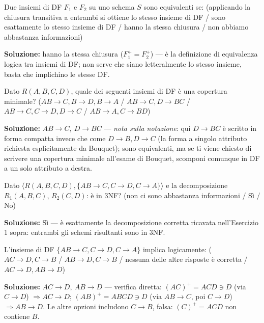 \documentclass[12pt, a4paper]{article}
\begin{document}
\begin{tcolorbox}[colback=lightergray!10, colframe=tocsec, title=\textbf{Esercizio 2}]
Due insiemi di DF $F_1$ e $F_2$ su uno schema $S$ sono equivalenti se: (applicando la chiusura transitiva a entrambi si ottiene lo stesso insieme di DF / sono esattamente lo stesso insieme di DF / hanno la stessa chiusura / non abbiamo abbastanza informazioni)
\end{tcolorbox}
\textbf{Soluzione:} hanno la stessa chiusura ($F_1^+ = F_2^+$) — è la definizione di equivalenza logica tra insiemi di DF; non serve che siano letteralmente lo stesso insieme, basta che implichino le stesse DF.

\begin{tcolorbox}[colback=lightergray!10, colframe=tocsec, title=\textbf{Esercizio 3}]
Dato $R(A,B,C,D)$, quale dei seguenti insiemi di DF è una copertura minimale? ($AB\to C, B\to D, B\to A$ / $AB\to C, D\to BC$ / $AB\to C, C\to D, D\to C$ / $AB\to A, C\to BD$)
\end{tcolorbox}
\textbf{Soluzione:} $AB\to C,\ D\to BC$ — \textit{nota sulla notazione}: qui $D\to BC$ è scritto in forma compatta invece che come $D\to B, D\to C$ (la forma a singolo attributo richiesta esplicitamente da Bouquet); sono equivalenti, ma se ti viene chiesto di scrivere una copertura minimale all'esame di Bouquet, scomponi comunque in DF a un solo attributo a destra.

\begin{tcolorbox}[colback=lightergray!10, colframe=tocsec, title=\textbf{Esercizio 4}]
Dato $\langle R(A,B,C,D), \{AB\to C, C\to D, C\to A\}\rangle$ e la decomposizione $R_1(A,B,C)$, $R_2(C,D)$: è in 3NF? (non ci sono abbastanza informazioni / Sì / No)
\end{tcolorbox}
\textbf{Soluzione:} Sì — è esattamente la decomposizione corretta ricavata nell'Esercizio 1 sopra: entrambi gli schemi risultanti sono in 3NF.

\begin{tcolorbox}[colback=lightergray!10, colframe=tocsec, title=\textbf{Esercizio 5}]
L'insieme di DF $\{AB\to C, C\to D, C\to A\}$ implica logicamente: ($AC\to D, C\to B$ / $AB\to D, C\to B$ / nessuna delle altre risposte è corretta / $AC\to D, AB\to D$)
\end{tcolorbox}
\textbf{Soluzione:} $AC\to D,\ AB\to D$ — verifica diretta: $(AC)^+=ACD \ni D$ (via $C\to D$) $\Rightarrow AC\to D$; $(AB)^+=ABCD \ni D$ (via $AB\to C$, poi $C\to D$) $\Rightarrow AB\to D$. Le altre opzioni includono $C\to B$, falsa: $(C)^+=ACD$ non contiene $B$.
\end{document}
